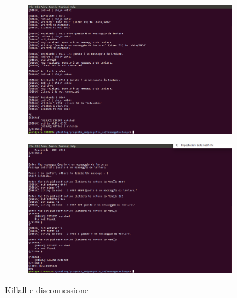 \begin{figure}
\centering
\begin{subfigure}[b]{0.8\textwidth}
\includegraphics[width=\textwidth]{screenmsg/16_server}
\caption{}
\end{subfigure}
\begin{subfigure}[b]{0.8\textwidth}
\includegraphics[width=\textwidth]{screenmsg/17_client_6932}
\caption{}
\end{subfigure}
\caption{Killall e disconnessione}
\end{figure}

